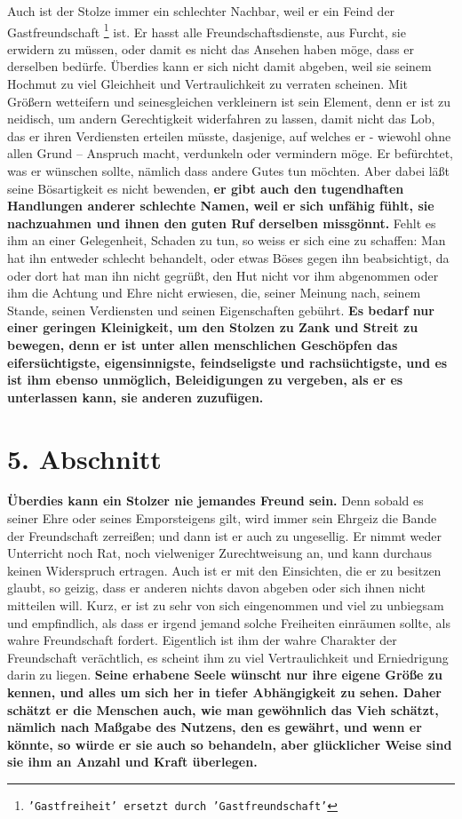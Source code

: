 Auch ist der Stolze immer ein schlechter Nachbar, weil er ein Feind der
Gastfreundschaft
\footnote{\texttt{'Gastfreiheit' ersetzt durch 'Gastfreundschaft'}}
 ist. Er hasst alle
Freundschaftsdienste, aus Furcht, sie erwidern
zu müssen, oder damit es nicht das Ansehen haben möge, dass er derselben bedürfe.
Überdies kann er sich nicht damit abgeben, weil sie seinem Hochmut zu viel
Gleichheit und Vertraulichkeit zu verraten scheinen. Mit
Größern wetteifern und
seinesgleichen verkleinern ist sein Element, denn er ist zu neidisch, um
andern Gerechtigkeit widerfahren zu lassen, damit nicht das Lob, das
er ihren
Verdiensten erteilen müsste, dasjenige, auf welches er - wiewohl ohne allen
Grund -- Anspruch macht, verdunkeln oder vermindern möge. Er befürchtet, was er
wünschen sollte, nämlich dass andere Gutes tun möchten. Aber dabei läßt seine
Bösartigkeit es nicht bewenden, \textbf{er gibt auch den tugendhaften
Handlungen
anderer schlechte Namen, weil er sich unfähig fühlt, sie nachzuahmen und ihnen
den guten Ruf derselben missgönnt.} Fehlt es ihm an einer Gelegenheit, Schaden zu
tun, so weiss er sich eine zu schaffen: Man hat ihn entweder schlecht behandelt,
oder etwas Böses gegen ihn beabsichtigt, da oder dort hat man ihn nicht gegrüßt,
den Hut nicht vor ihm abgenommen oder ihm die Achtung und Ehre nicht erwiesen,
die, seiner Meinung nach, seinem Stande, seinen Verdiensten und seinen
Eigenschaften gebührt. \textbf{Es bedarf nur einer geringen Kleinigkeit, um den
Stolzen
zu Zank und Streit zu bewegen, denn er ist unter allen
menschlichen Geschöpfen
das eifersüchtigste, eigensinnigste, feindseligste und rachsüchtigste, und es
ist ihm ebenso unmöglich, Beleidigungen zu vergeben, als er es unterlassen kann,
sie anderen zuzufügen.}

\section{5. Abschnitt} \label{kap12_ab5}

\textbf{Überdies kann ein Stolzer nie jemandes Freund sein.} Denn sobald es seiner
Ehre
oder seines Emporsteigens gilt, wird immer sein Ehrgeiz die Bande der Freundschaft
zerreißen; und dann ist er auch zu ungesellig. Er nimmt weder Unterricht noch
Rat, noch vielweniger Zurechtweisung an, und kann
durchaus keinen Widerspruch
ertragen. Auch ist er mit den Einsichten, die er zu besitzen glaubt, so geizig,
dass er anderen nichts davon abgeben oder sich ihnen nicht mitteilen will.
Kurz, er ist zu sehr von sich eingenommen und viel zu unbiegsam und empfindlich,
als dass er irgend jemand solche Freiheiten einräumen sollte, als wahre
Freundschaft fordert. Eigentlich ist ihm der wahre Charakter der Freundschaft
verächtlich, es scheint ihm zu viel Vertraulichkeit und Erniedrigung darin zu
liegen. \textbf{Seine erhabene Seele wünscht nur ihre eigene Größe zu kennen,
und alles
um sich her in tiefer Abhängigkeit zu sehen. Daher schätzt er die Menschen auch,
wie man gewöhnlich das Vieh schätzt, nämlich nach Maßgabe des Nutzens, den es
gewährt, und wenn er könnte, so würde er sie auch so behandeln, aber glücklicher
Weise sind sie ihm an Anzahl und Kraft überlegen.}

